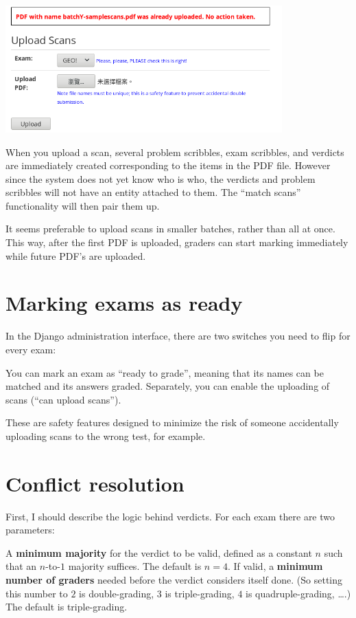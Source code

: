 \begin{center}
	\includegraphics[width=0.8\textwidth]{images/batchscan.png}
\end{center}

When you upload a scan,
several problem scribbles, exam scribbles, and verdicts
are immediately created corresponding to the items in the PDF file.
However since the system does not yet know who is who,
the verdicts and problem scribbles will not have an entity attached to them.
The ``match scans'' functionality will then pair them up.

It seems preferable to upload scans in smaller batches,
rather than all at once.
This way, after the first PDF is uploaded,
graders can start marking immediately
while future PDF's are uploaded.

\section{Marking exams as ready}
In the Django administration interface,
there are two switches you need to flip for every exam:
\begin{itemize}
	\ii You can mark an exam as ``ready to grade'',
	meaning that its names can be matched and its answers graded.
	\ii Separately, you can enable the uploading of scans
	(``can upload scans'').
\end{itemize}
These are safety features designed to minimize the risk
of someone accidentally uploading scans to the wrong test, for example.

\section{Conflict resolution}
First, I should describe the logic behind verdicts.
For each exam there are two parameters:
\begin{itemize}
	\ii A \textbf{minimum majority} for the verdict to be valid,
	defined as a constant $n$ such that an $n$-to-$1$ majority suffices.
	The default is $n=4$.
	\ii If valid, a \textbf{minimum number of graders} needed before
	the verdict considers itself done.
	(So setting this number to $2$ is double-grading,
	$3$ is triple-grading, $4$ is quadruple-grading, \dots.)
	The default is triple-grading.
\end{itemize}

